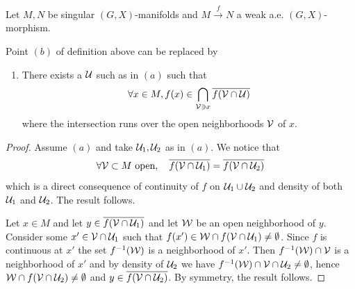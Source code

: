 \begin{lem}
 Let $M,N$ be singular $(G,X)$-manifolds and $M\xrightarrow{f} N$ a weak a.e. $(G,X)$-morphism.

 Point $(b)$ of definition above can be replaced by 
 \begin{enumerate}
  \item[(b')] There exists a $\mathcal{U}$ such as in $(a)$ such that 
 $$\forall x\in M, f(x) \in \bigcap_{\mathcal V\ni x} \overline {f(\mathcal V\cap \mathcal{U})}$$
 where the intersection runs over the open neighborhoods $\mathcal V$ of $x$. 
 \end{enumerate}

\end{lem}
\begin{proof} Assume $(a)$ and take $\mathcal{U}_1,\mathcal{U}_2$ as in $(a)$. 
We notice that
$$\forall \mathcal V\subset M \text{ open}, \quad \overline {f(\mathcal V\cap \mathcal{U}_1)} =   \overline {f(\mathcal V\cap \mathcal{U}_2)}$$
which is a direct consequence of continuity of $f$ on $\mathcal{U}_1\cup \mathcal{U}_2$ and density of both $\mathcal{U}_1$ and $\mathcal{U}_2$.
The result follows.

Let $x\in M$ and let $y\in \overline {f(\mathcal V\cap \mathcal{U}_1)}$ and let $\mathcal W$ be an open neighborhood of $y$. Consider some $x'\in \mathcal V\cap \mathcal{U}_1$ such that $f(x')\in \mathcal W \cap f(\mathcal V\cap \mathcal{U}_1)\neq \emptyset$. Since $f$ is continuous at $x'$ the set $f^{-1}(\mathcal W)$ is a neighborhood of $x'$. Then $f^{-1}(\mathcal W)\cap \mathcal V$ is a neighborhood of  $x'$ and by density of $\mathcal{U}_2$ we have $f^{-1}(\mathcal W)\cap\mathcal V\cap\mathcal{U}_2 \neq \emptyset$, hence $\mathcal W\cap f(\mathcal V\cap\mathcal{U}_2) \neq \emptyset$ and $y\in \overline {f(\mathcal V\cap \mathcal{U}_2)}$. By symmetry, the result follows.

\end{proof}



